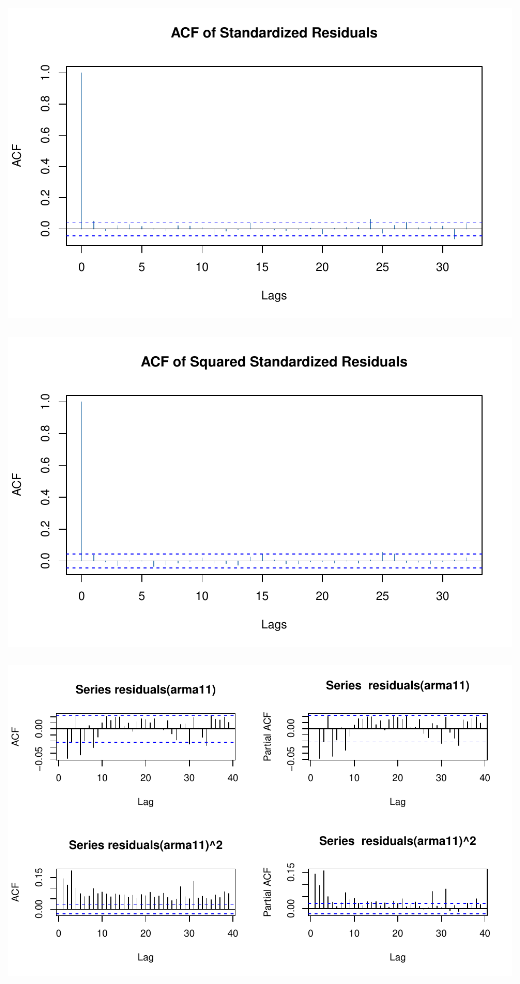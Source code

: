 \documentclass[11pt]{article}\usepackage[]{graphicx}\usepackage[]{color}
\makeatletter
\def\maxwidth{ %
  \ifdim\Gin@nat@width>\linewidth
    \linewidth
  \else
    \Gin@nat@width
  \fi
}
\newenvironment{knitrout}{}{} %
\makeatother
\begin{document}
\begin{knitrout}
{\centering \includegraphics[width=\maxwidth]{figure/garch2-7} 

}




{\centering \includegraphics[width=\maxwidth]{figure/garch2-8} 

}




{\centering \includegraphics[width=\maxwidth]{figure/garch2-9} 

}
\end{knitrout}
\end{document}
